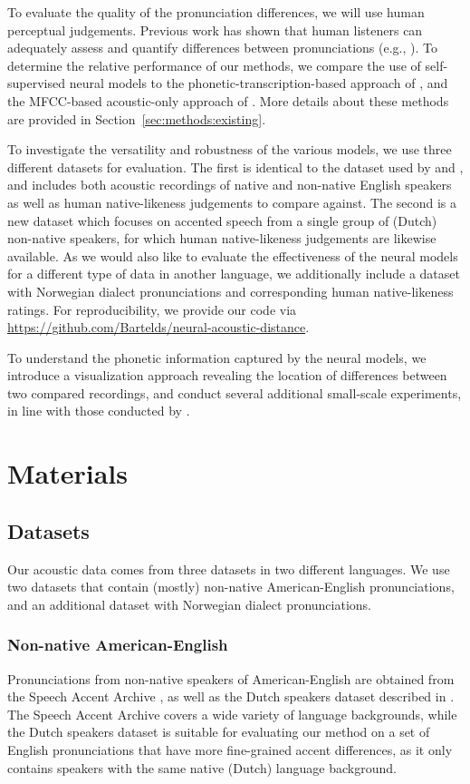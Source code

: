 \documentclass[11pt,a4paper]{article}
\begin{document}
To evaluate the quality of the pronunciation differences, we will use human perceptual judgements. Previous work has shown that human listeners can adequately assess and quantify differences between pronunciations (e.g., \citealp{long1999, gooskens2005, scharenborg2007}). To determine the relative performance of our methods, we compare the use of self-supervised neural models to the phonetic-transcription-based approach of \citet{wieling2014a}, and the MFCC-based acoustic-only approach of \citet{acoustic-measure}.
More details about these methods are provided in Section~\ref{sec:methods:existing}.

To investigate the versatility and robustness of the various models, we use three different datasets for evaluation.
The first is identical to the dataset used by \citet{wieling2014a} and \citet{acoustic-measure}, and includes both acoustic recordings of native and non-native English speakers as well as human native-likeness judgements to compare against.
The second is a new dataset which focuses on accented speech from a single group of (Dutch) non-native speakers, for which human native-likeness judgements are likewise available. As we would also like to evaluate the effectiveness of the neural models for a different type of data in another language, we additionally include a dataset with Norwegian dialect pronunciations and corresponding human native-likeness ratings.
For reproducibility, we provide our code via \url{https://github.com/Bartelds/neural-acoustic-distance}.

To understand the phonetic information captured by the neural models, we introduce a visualization approach revealing the location of differences between two compared recordings, and conduct several additional small-scale experiments, in line with those conducted by \citet{acoustic-measure}.

\section{Materials}
\subsection{Datasets}
Our acoustic data comes from three datasets in two different languages.
We use two datasets that contain (mostly) non-native American-English pronunciations, and an additional dataset with Norwegian dialect pronunciations.

\subsubsection{Non-native American-English}
Pronunciations from non-native speakers of American-English are obtained from the Speech Accent Archive \citep{weinberger2015speech}, as well as the Dutch speakers dataset described in \citet{wielinglowlands}.
The Speech Accent Archive covers a wide variety of language backgrounds, while the Dutch speakers dataset is suitable for
evaluating our method on a set of English pronunciations that have more fine-grained accent differences, as it only contains speakers with the same native (Dutch) language background.
\end{document}
